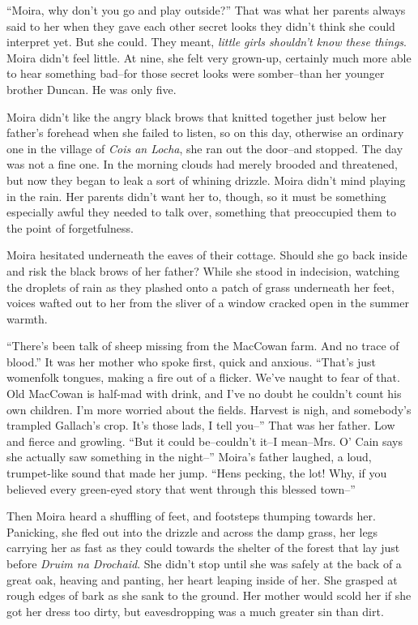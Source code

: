 \documentclass[letterpaper, twoside, 12pt]{memoir}
\begin{document}
“Moira, why don’t you go and play outside?”
That was what her parents always said to her when they gave each other secret looks they didn’t think she could interpret yet. But she could. They meant, \textit{little girls shouldn’t know these things}. Moira didn’t feel little. At nine, she felt very grown-up, certainly much more able to hear something bad--for those secret looks were somber--than her younger brother Duncan. He was only five.

Moira didn’t like the angry black brows that knitted together just below her father’s forehead when she failed to listen, so on this day, otherwise an ordinary one in the village of \textit{Cois an Locha}, she ran out the door--and stopped.
The day was not a fine one. In the morning clouds had merely brooded and threatened, but now they began to leak a sort of whining drizzle. Moira didn’t mind playing in the rain. Her parents didn’t want her to, though, so it must be something especially awful they needed to talk over, something that preoccupied them to the point of forgetfulness.

Moira hesitated underneath the eaves of their cottage. Should she go back inside and risk the black brows of her father? While she stood in indecision, watching the droplets of rain as they plashed onto a patch of grass underneath her feet, voices wafted out to her from the sliver of a window cracked open in the summer warmth.

“There’s been talk of sheep missing from the MacCowan farm. And no trace of blood.” It was her mother who spoke first, quick and anxious.
“That’s just womenfolk tongues, making a fire out of a flicker. We’ve naught to fear of that. Old MacCowan is half-mad with drink, and I’ve no doubt he couldn’t count his own children. I’m more worried about the fields. Harvest is nigh, and somebody’s trampled Gallach’s crop. It’s those lads, I tell you--” That was her father. Low and fierce and growling.
“But it could be--couldn’t it--I mean--Mrs. O’ Cain says she actually saw something in the night--”
Moira’s father laughed, a loud, trumpet-like sound that made her jump. “Hens pecking, the lot! Why, if you believed every green-eyed story that went through this blessed town--” 

Then Moira heard a shuffling of feet, and footsteps thumping towards her. Panicking, she fled out into the drizzle and across the damp grass, her legs carrying her as fast as they could towards the shelter of the forest that lay just before \textit{Druim na Drochaid}. 
She didn’t stop until she was safely at the back of a great oak, heaving and panting, her heart leaping inside of her. She grasped at rough edges of bark as she sank to the ground. Her mother would scold her if she got her dress too dirty, but eavesdropping was a much greater sin than dirt.
\end{document}
